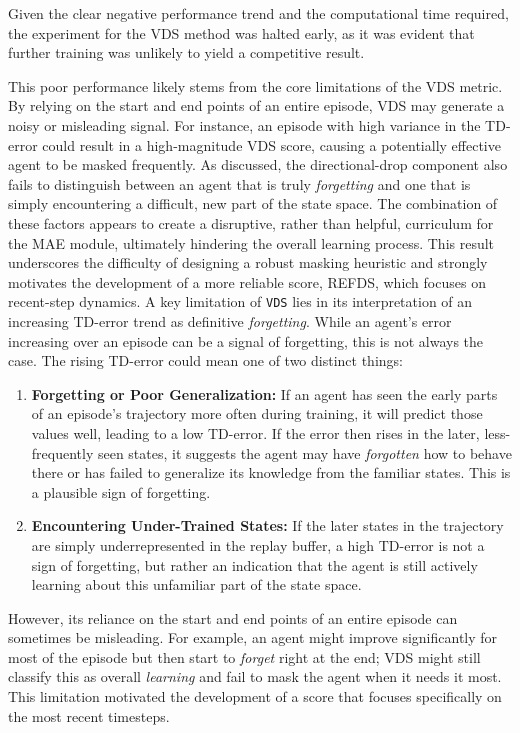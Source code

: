 Given the clear negative performance trend and the computational time required, the experiment for the VDS method was halted early, as it was evident that further training was unlikely to yield a competitive result.

This poor performance likely stems from the core limitations of the VDS metric. By relying on the start and end points of an entire episode, VDS may generate a noisy or misleading signal. For instance, an episode with high variance in the TD-error could result in a high-magnitude VDS score, causing a potentially effective agent to be masked frequently. As discussed, the directional-drop component also fails to distinguish between an agent that is truly \textit{forgetting } and one that is simply encountering a difficult, new part of the state space. The combination of these factors appears to create a disruptive, rather than helpful, curriculum for the MAE module, ultimately hindering the overall learning process. This result underscores the difficulty of designing a robust masking heuristic and strongly motivates the development of a more reliable score, REFDS, which focuses on recent-step dynamics.
A key limitation of \texttt{VDS} lies in its interpretation of an increasing TD-error trend as definitive \textit{forgetting}. While an agent's error increasing over an episode can be a signal of forgetting, this is not always the case. The rising TD-error could mean one of two distinct things:

\begin{enumerate}
    \item \textbf{Forgetting or Poor Generalization:} If an agent has seen the early parts of an episode's trajectory more often during training, it will predict those values well, leading to a low TD-error. If the error then rises in the later, less-frequently seen states, it suggests the agent may have \textit{forgotten} how to behave there or has failed to generalize its knowledge from the familiar states. This is a plausible sign of forgetting.
    
    \item \textbf{Encountering Under-Trained States:} If the later states in the trajectory are simply underrepresented in the replay buffer, a high TD-error is not a sign of forgetting, but rather an indication that the agent is still actively learning about this unfamiliar part of the state space.
\end{enumerate}
However, its reliance on the start and end points of an entire episode can sometimes be misleading. For example, an agent might improve significantly for most of the episode but then start to \textit{forget} right at the end; VDS might still classify this as overall \textit{learning} and fail to mask the agent when it needs it most. This limitation motivated the development of a score that focuses specifically on the most recent timesteps.


